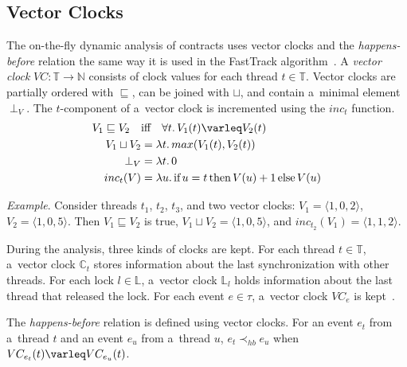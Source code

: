 \subsection{Vector Clocks}

The on-the-fly dynamic analysis of contracts uses vector clocks and the
\emph{happens-before} relation the same way it is used in the FastTrack
algorithm~\cite{fasttrack}. A \emph{vector clock} $VC: \mathbb{T} \rightarrow
\mathbb{N}$ consists of clock values for each thread $t \in \mathbb{T}$. Vector
clocks are partially ordered with $\sqsubseteq$, can be joined with $\sqcup$,
and contain a~minimal element $\perp_V$. The $t$-component of a~vector clock is
incremented using the $inc_t$ function.
\begin{align*}
    V_1 \sqsubseteq V_2 \quad &\text{iff} \quad \forall t. \, V_1(t) \varleq
    V_2(t) \\
    V_1 \sqcup V_2 &= \lambda t. \, max(V_1(t), V_2(t)) \\
    \perp_V &= \lambda t. \, 0 \\
    inc_t(V) &= \lambda u. \, \text{if} \, u=t \, \text{then} \, V(u)+1 \,
    \text{else} \, V(u)
\end{align*}

\emph{Example}. Consider threads $t_1$, $t_2$, $t_3$, and two vector clocks:
$V_1 = \langle 1,0,2 \rangle$, $V_2 = \langle 1,0,5 \rangle$. Then $V_1
\sqsubseteq V_2$ is true, $V_1 \sqcup V_2 = \langle 1,0,5 \rangle$, and
$inc_{t_2}(V_1) = \langle 1,1,2 \rangle$.

During the analysis, three kinds of clocks are kept. For each thread $t \in
\mathbb{T}$, a~vector clock $\mathbb{C}_t$ stores information about the last
synchronization with other threads. For each lock $l \in \mathbb{L}$, a~vector
clock $\mathbb{L}_l$ holds information about the last thread that released the
lock. For each event $e \in \tau$, a~vector clock $VC_e$ is
kept~\cite{contracts}.

The \emph{happens-before} relation is defined using vector clocks. For an event
$e_t$ from a~thread $t$ and an event $e_u$ from a~thread $u$, $e_t \prec_{hb}
e_u$ when $VC_{e_t}(t) \varleq VC_{e_u}(t)$.

